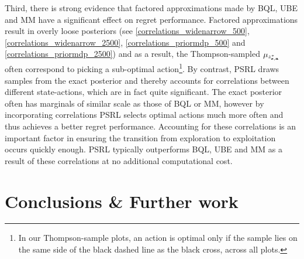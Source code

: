 \documentclass{article}
\begin{document}
Third, there is strong evidence that factored approximations made by BQL, UBE and MM have a significant effect on regret performance. Factored approximations result in overly loose posteriors (see \cref{correlations_widenarrow_500}, \cref{correlations_widenarrow_2500}, \cref{correlations_priormdp_500} and \cref{correlations_priormdp_2500}) and as a result, the Thompson-sampled $\mu_{z^*_{\mathbf{s}, \mathbf{a}}}$ often correspond to picking a sub-optimal action\footnote{In our Thompson-sample plots, an action is optimal only if the sample lies on the same side of the black dashed line as the black cross, across all plots.}. By contrast, PSRL draws samples from the exact posterior and thereby accounts for correlations between different state-actions, which are in fact quite significant. The exact posterior often has marginals of similar scale as those of BQL or MM, however by incorporating correlations PSRL selects optimal actions much more often and thus achieves a better regret performance. Accounting for these correlations is an important factor in ensuring the transition from exploration to exploitation occurs quickly enough. PSRL typically outperforms BQL, UBE and MM as a result of these correlations at no additional computational cost.

\section{Conclusions \& Further work}
\end{document}

